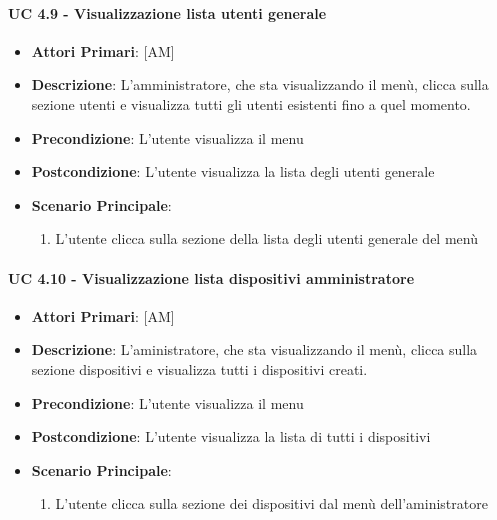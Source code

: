 			\paragraph{UC 4.9 - Visualizzazione lista utenti generale}
			\begin{itemize}
				\item \textbf{Attori Primari}: [AM]
				\item \textbf{Descrizione}: L'amministratore, che sta visualizzando il menù, clicca sulla sezione utenti e visualizza tutti gli utenti esistenti fino a quel momento.
				\item \textbf{Precondizione}: L'utente visualizza il menu
				\item \textbf{Postcondizione}: L'utente visualizza la lista degli utenti generale 
				\item \textbf{Scenario Principale}:
				\begin{enumerate}
					\item{L'utente clicca sulla sezione della lista degli utenti generale del menù}
				\end{enumerate}	
			\end{itemize}

			\paragraph{UC 4.10 - Visualizzazione lista dispositivi amministratore}
			\begin{itemize}
				\item \textbf{Attori Primari}: [AM]
				\item \textbf{Descrizione}: L'aministratore, che sta visualizzando il menù, clicca sulla sezione dispositivi e visualizza tutti i dispositivi creati.
				\item \textbf{Precondizione}: L'utente visualizza il menu
				\item \textbf{Postcondizione}: L'utente visualizza la lista di tutti i dispositivi
				\item \textbf{Scenario Principale}:
				\begin{enumerate}
					\item{L'utente clicca sulla sezione dei dispositivi dal menù dell'aministratore}
				\end{enumerate}	
			\end{itemize}

